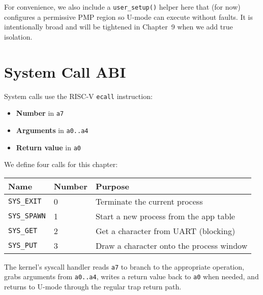 For convenience, we also include a \texttt{user\_setup()} helper here that (for now) configures a permissive PMP region so U-mode can execute without faults.  It is intentionally broad and will be tightened in Chapter~9 when we add true isolation.

\section{System Call ABI}

System calls use the RISC-V \texttt{ecall} instruction:

\begin{itemize}
  \item \textbf{Number} in \texttt{a7}
  \item \textbf{Arguments} in \texttt{a0..a4}
  \item \textbf{Return value} in \texttt{a0}
\end{itemize}

We define four calls for this chapter:

\begin{center}
\begin{tabular}{lll}
\toprule
Name & Number & Purpose \\
\midrule
\texttt{SYS\_EXIT}  & 0 & Terminate the current process \\
\texttt{SYS\_SPAWN} & 1 & Start a new process from the app table \\
\texttt{SYS\_GET}   & 2 & Get a character from UART (blocking) \\
\texttt{SYS\_PUT}   & 3 & Draw a character onto the process window \\
\bottomrule
\end{tabular}
\end{center}

\begin{figure}[H]
\centering

\end{figure}

The kernel’s syscall handler reads \texttt{a7} to branch to the appropriate operation, grabs arguments from \texttt{a0..a4}, writes a return value back to \texttt{a0} when needed, and returns to U-mode through the regular trap return path.

\begin{figure}[H]
\centering

\end{figure}

